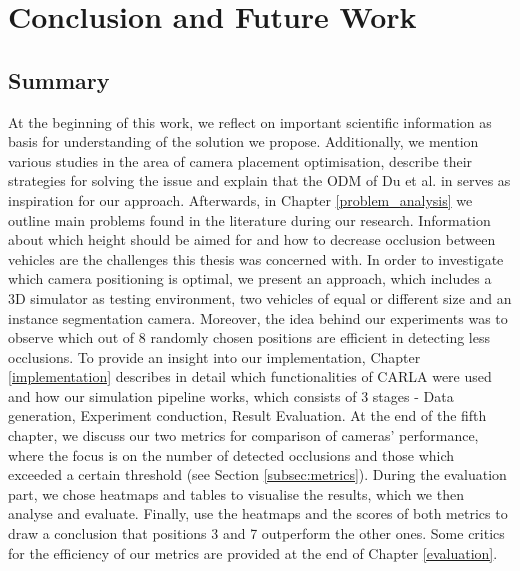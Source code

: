 \chapter{Conclusion and Future Work}
\label{conclusion}
\section{Summary}
At the beginning of this work, we reflect on important scientific information as basis for understanding of the solution we propose. Additionally, we mention various studies in the area of camera placement optimisation, describe their strategies for solving the issue and explain that the ODM of Du et al. in \cite{occlusion_degree_model} serves as inspiration for our approach. Afterwards, in Chapter \ref{problem_analysis} we outline main problems found in the literature during our research. Information about which height should be aimed for and how to decrease occlusion between vehicles are the challenges this thesis was concerned with. In order to investigate which camera positioning is optimal, we present an approach, which includes a 3D simulator as testing environment, two vehicles of equal or different size and an instance segmentation camera. Moreover, the idea behind our experiments was to observe which out of 8 randomly chosen positions are efficient in detecting less occlusions. To provide an insight into our implementation, Chapter \ref{implementation} describes in detail which functionalities of CARLA were used and how our simulation pipeline works, which consists of 3 stages - Data generation, Experiment conduction, Result Evaluation. At the end of the fifth chapter, we discuss our two metrics for comparison of cameras' performance, where the focus is on the number of detected occlusions and those which exceeded a certain threshold (see Section \ref{subsec:metrics}). During the evaluation part, we chose heatmaps and tables to visualise the results, which we then analyse and evaluate. Finally, use the heatmaps and the scores of both metrics to draw a conclusion that positions 3 and 7 outperform the other ones. Some critics for the efficiency of our metrics are provided at the end of Chapter \ref{evaluation}. 

